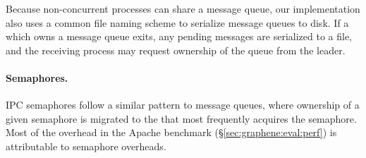 Because non-concurrent processes can share a message queue,
our implementation also uses a common file naming scheme to serialize message queues to disk.
If a \picoproc{} which owns a message queue exits, 
any pending messages are serialized to a file,
and the receiving process may request ownership of the queue from the leader.




\paragraph{Semaphores.} IPC semaphores 
follow a similar pattern to message queues, where ownership of a given semaphore is migrated
to the \picoproc{} that most frequently acquires the semaphore.
Most of the overhead in the Apache benchmark (\S\ref{sec:graphene:eval:perf}) is attributable to semaphore overheads.

